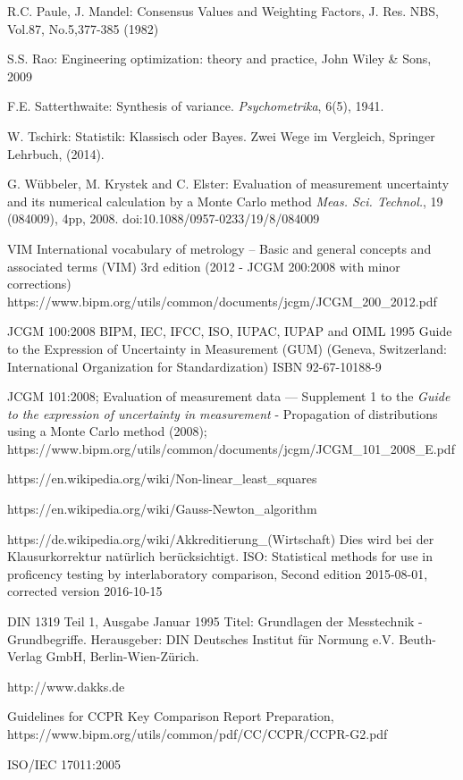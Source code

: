 \documentclass[a4paper,11pt]{book}
\begin{document}
\begin{flushleft}
\begin{thebibliography}{------}
      R.C. Paule, J. Mandel: Consensus Values and Weighting Factors, J. Res. NBS, Vol.87, No.5,377-385 (1982)

     S.S. Rao: Engineering optimization: theory and practice,
    John Wiley \& Sons, 2009

     F.E. Satterthwaite: Synthesis of variance. {\em Psychometrika}, 6(5), 1941.

     W. Tschirk: Statistik: Klassisch oder Bayes. Zwei Wege im Vergleich, Springer Lehrbuch, (2014).

     G. Wübbeler, M. Krystek and C. Elster: Evaluation of measurement uncertainty
    and its numerical calculation by a Monte Carlo method
    {\em Meas. Sci. Technol.}, 19 (084009), 4pp, 2008.
    doi:10.1088/0957-0233/19/8/084009


     VIM International vocabulary of metrology – Basic and general
     concepts and associated terms (VIM) 3rd edition (2012 - JCGM 200:2008 with minor corrections)
     \newline https://www.bipm.org/utils/common/documents/jcgm/JCGM\_200\_2012.pdf

     JCGM 100:2008 BIPM, IEC, IFCC, ISO, IUPAC, IUPAP and OIML 1995 Guide to the Expression of Uncertainty in Measurement (GUM)
    (Geneva, Switzerland: International Organization for
    Standardization) ISBN 92-67-10188-9

    JCGM 101:2008; Evaluation of measurement data — Supplement 1 to the
    \textsl{Guide to the expression of uncertainty in measurement} -
    Propagation of distributions using a Monte Carlo method (2008); \newline
    https://www.bipm.org/utils/common/documents/jcgm/JCGM\_101\_2008\_E.pdf

     https://en.wikipedia.org/wiki/Non-linear\_least\_squares

     https://en.wikipedia.org/wiki/Gauss-Newton\_algorithm

     https://de.wikipedia.org/wiki/Akkreditierung\_(Wirtschaft)
 Dies wird bei der Klausurkorrektur natürlich berücksichtigt.
     ISO: Statistical methods for use in proficency testing by interlaboratory comparison, Second edition 2015-08-01, corrected version 2016-10-15

     DIN 1319 Teil 1, Ausgabe Januar 1995 Titel: Grundlagen der Messtechnik - Grundbegriffe. Herausgeber: DIN Deutsches Institut für Normung e.V. Beuth-Verlag GmbH, Berlin-Wien-Zürich.

     http://www.dakks.de

     Guidelines for CCPR Key Comparison Report
    Preparation, https://www.bipm.org/utils/common/pdf/CC/CCPR/CCPR-G2.pdf

    ISO/IEC 17011:2005
\end{thebibliography}
\end{flushleft}
\end{document}
